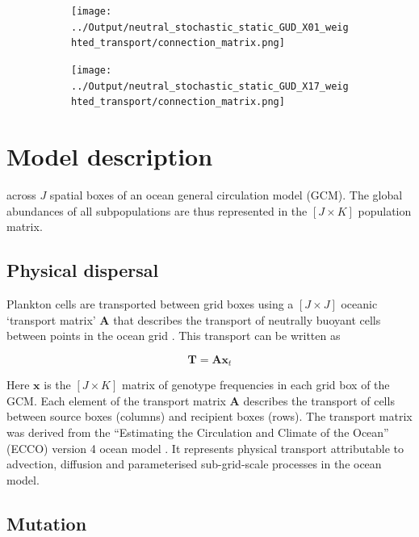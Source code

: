 \documentclass[12pt]{article}
\begin{document}
\begin{figure}[htp!]
\begin{subfigure}{0.5\textwidth}
\texttt{[image: ../Output/neutral\_stochastic\_static\_GUD\_X01\_weighted\_transport/connection\_matrix.png]}
\end{subfigure}
\begin{subfigure}{0.5\textwidth}
\texttt{[image: ../Output/neutral\_stochastic\_static\_GUD\_X17\_weighted\_transport/connection\_matrix.png]}
\end{subfigure}
\caption{}
\label{Schematic}
\end{figure}



\section{Model description}





across $J$ spatial boxes of an ocean general circulation model (GCM). The global abundances of all subpopulations are thus represented in the $[J\times K]$ population matrix.



\subsection*{Physical dispersal}

Plankton cells are transported between grid boxes using a $[J\times J]$ oceanic `transport matrix' $\mathbf{A}$ that describes the transport of neutrally buoyant cells between points in the ocean grid \citep{Khatiwala:2005}. This transport can be written as 

\begin{equation}
\label{ }
\mathbf{T} = \mathbf{A}\mathbf{x}_{t}
\end{equation}

Here $\mathbf{x}$ is the $[J\times K]$ matrix of genotype frequencies in each grid box of the GCM. Each element of the transport matrix $\mathbf{A}$ describes the transport of cells between source boxes (columns) and recipient boxes (rows). The transport matrix was derived from the ``Estimating the Circulation and Climate of the Ocean'' (ECCO) version 4 ocean model \citep{}. It represents physical transport attributable to advection, diffusion and parameterised sub-grid-scale processes in the ocean model. 

\subsection*{Mutation}
\end{document}
